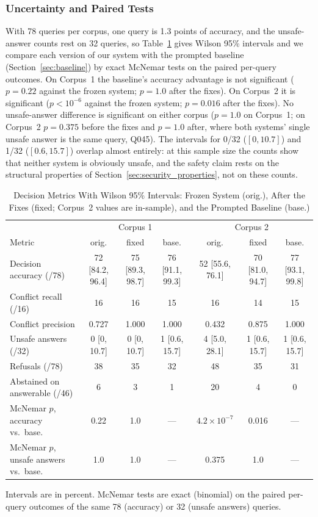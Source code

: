 \documentclass[conference]{IEEEtran}
\begin{document}
\subsubsection{Uncertainty and Paired Tests}
\label{sec:ci_mcnemar}

With 78 queries per corpus, one query is 1.3 points of accuracy, and the
unsafe-answer counts rest on 32 queries, so Table~\ref{tab:ci_mcnemar}
gives Wilson 95\% intervals and we compare each version of our system with
the prompted baseline (Section~\ref{sec:baseline}) by exact McNemar tests on
the paired per-query outcomes. On Corpus~1 the baseline's accuracy advantage
is not significant ($p=0.22$ against the frozen system; $p=1.0$ after the
fixes). On Corpus~2 it is significant ($p<10^{-6}$ against the frozen system;
$p=0.016$ after the fixes). No unsafe-answer difference is significant on
either corpus ($p=1.0$ on Corpus~1; on Corpus~2 $p=0.375$ before the fixes
and $p=1.0$ after, where both systems' single unsafe answer is the same
query, Q045). The intervals for 0/32 ($[0, 10.7]$) and 1/32
($[0.6, 15.7]$) overlap almost entirely: at this sample size the counts
show that neither system is obviously unsafe, and the safety claim rests on
the structural properties of Section~\ref{sec:security_properties}, not on
these counts.

\begin{table}[t]
\caption{Decision Metrics With Wilson 95\% Intervals: Frozen System (orig.),
After the Fixes (fixed; Corpus~2 values are in-sample), and the Prompted
Baseline (base.)}
\label{tab:ci_mcnemar}
\centering
\small
\begin{tabular}{l c c c c c c}
\toprule
 & \multicolumn{3}{c}{Corpus 1} & \multicolumn{3}{c}{Corpus 2} \\
Metric & orig. & fixed & base. & orig. & fixed & base. \\
\midrule
Decision accuracy (/78) & 72 [84.2, 96.4] & 75 [89.3, 98.7] & 76 [91.1, 99.3]
                        & 52 [55.6, 76.1] & 70 [81.0, 94.7] & 77 [93.1, 99.8] \\
Conflict recall (/16)   & 16 & 16 & 15 & 16 & 14 & 15 \\
Conflict precision      & 0.727 & 1.000 & 1.000 & 0.432 & 0.875 & 1.000 \\
Unsafe answers (/32)    & 0 [0, 10.7] & 0 [0, 10.7] & 1 [0.6, 15.7]
                        & 4 [5.0, 28.1] & 1 [0.6, 15.7] & 1 [0.6, 15.7] \\
Refusals (/78)          & 38 & 35 & 32 & 48 & 35 & 31 \\
Abstained on answerable (/46) & 6 & 3 & 1 & 20 & 4 & 0 \\
\midrule
McNemar $p$, accuracy vs.\ base.      & 0.22 & 1.0 & --- & $4.2\times10^{-7}$ & 0.016 & --- \\
McNemar $p$, unsafe answers vs.\ base. & 1.0  & 1.0 & --- & 0.375 & 1.0 & --- \\
\bottomrule
\end{tabular}

\vspace{3pt}
\raggedright\scriptsize
Intervals are in percent. McNemar tests are exact (binomial) on the paired
per-query outcomes of the same 78 (accuracy) or 32 (unsafe answers) queries.
\end{table}
\end{document}
